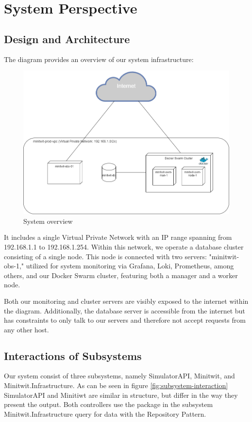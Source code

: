 \section{System Perspective}

\subsection{Design and Architecture}
The diagram provides an overview of our system infrastructure:
\begin{figure}[H]
    \centering
    \includegraphics[width=0.7\linewidth]{images/system-overview2.png}
    \caption{System overview}
    \label{fig:enter-label}
\end{figure}
It includes a single Virtual Private Network with an IP range spanning from 192.168.1.1 to 192.168.1.254. Within this network, we operate a database cluster consisting of a single node. This node is connected with two servers: "minitwit-obs-1," utilized for system monitoring via Grafana, Loki, Prometheus, among others, and our Docker Swarm cluster, featuring both a manager and a worker node.

Both our monitoring and cluster servers are visibly exposed to the internet within the diagram. Additionally, the database server is accessible from the internet but has constraints to only talk to our servers and therefore not accept requests from any other host.

\subsection{Interactions of Subsystems}
Our system consist of three subsystems, namely SimulatorAPI, Minitwit, and Minitwit.Infrastructure. As can be seen in figure \ref{fig:subsystem-interaction} SimulatorAPI and Minitiwt are similar in structure, but differ in the way they present the output. Both controllers use the package in the subsystem Minitwit.Infrastructure query for data with the Repository Pattern.

